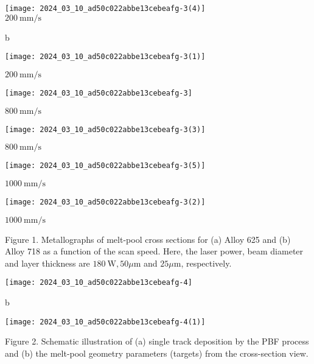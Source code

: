 \documentclass[10pt]{article}
\begin{document}
\texttt{[image: 2024\_03\_10\_ad50c022abbe13cebeafg-3(4)]}\\
$200 \mathrm{~mm} / \mathrm{s}$

b

\begin{center}
\texttt{[image: 2024\_03\_10\_ad50c022abbe13cebeafg-3(1)]}
\end{center}

$200 \mathrm{~mm} / \mathrm{s}$

\begin{center}
\texttt{[image: 2024\_03\_10\_ad50c022abbe13cebeafg-3]}
\end{center}

$800 \mathrm{~mm} / \mathrm{s}$

\begin{center}
\texttt{[image: 2024\_03\_10\_ad50c022abbe13cebeafg-3(3)]}
\end{center}

$800 \mathrm{~mm} / \mathrm{s}$

\begin{center}
\texttt{[image: 2024\_03\_10\_ad50c022abbe13cebeafg-3(5)]}
\end{center}

$1000 \mathrm{~mm} / \mathrm{s}$

\begin{center}
\texttt{[image: 2024\_03\_10\_ad50c022abbe13cebeafg-3(2)]}
\end{center}

$1000 \mathrm{~mm} / \mathrm{s}$

Figure 1. Metallographs of melt-pool cross sections for (a) Alloy 625 and (b) Alloy 718 as a function of the scan speed. Here, the laser power, beam diameter and layer thickness are $180 \mathrm{~W}, 50 \mu \mathrm{m}$ and $25 \mu \mathrm{m}$, respectively.

\begin{center}
\texttt{[image: 2024\_03\_10\_ad50c022abbe13cebeafg-4]}
\end{center}

b

\begin{center}
\texttt{[image: 2024\_03\_10\_ad50c022abbe13cebeafg-4(1)]}
\end{center}

Figure 2. Schematic illustration of (a) single track deposition by the PBF process and (b) the melt-pool geometry parameters (targets) from the cross-section view.
\end{document}
